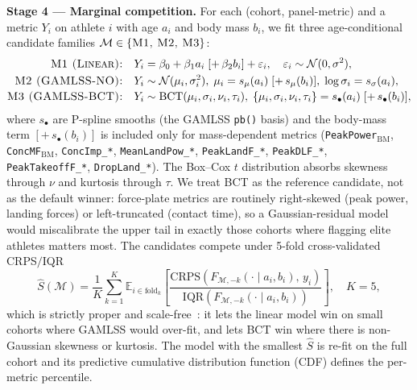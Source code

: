 \documentclass[10pt]{article}
\begin{document}
\textbf{Stage 4 --- Marginal competition.}
For each (cohort, panel-metric) and a metric $Y_i$ on athlete $i$ with
age $a_i$ and body mass $b_i$, we fit three age-conditional candidate
families $\mathcal{M} \in \{\textsc{M1, M2, M3}\}$:
\begin{align}
\textsc{M1 (Linear):}\quad &
Y_i = \beta_0 + \beta_1 a_i \;[+\, \beta_2 b_i] + \varepsilon_i,
\quad \varepsilon_i \sim \mathcal{N}(0, \sigma^2),
\label{eq:m1}\\[-1pt]
\textsc{M2 (GAMLSS-NO):}\quad &
Y_i \sim \mathcal{N}(\mu_i, \sigma_i^2),\;
\mu_i = s_\mu(a_i) \;[+\, s_\mu(b_i)],\;
\log \sigma_i = s_\sigma(a_i),
\label{eq:m2}\\[-1pt]
\textsc{M3 (GAMLSS-BCT):}\quad &
Y_i \sim \mathrm{BCT}(\mu_i, \sigma_i, \nu_i, \tau_i),\;
\{\mu_i, \sigma_i, \nu_i, \tau_i\} = s_\bullet(a_i) \;[+\, s_\bullet(b_i)],
\label{eq:m3}
\end{align}
where $s_\bullet$ are P-spline smooths (the GAMLSS \texttt{pb()} basis)
and the body-mass term $[+\, s_\bullet(b_i)]$ is included only for
mass-dependent metrics (\texttt{PeakPower$_{\text{BM}}$},
\texttt{ConcMF$_{\text{BM}}$}, \texttt{ConcImp\_*},
\texttt{MeanLandPow\_*}, \texttt{PeakLandF\_*}, \texttt{PeakDLF\_*},
\texttt{PeakTakeoffF\_*}, \texttt{DropLand\_*}). The Box--Cox $t$
distribution \cite{rigby2005gamlss, stasinopoulos2007gamlss} absorbs
skewness through $\nu$ and kurtosis through $\tau$. We treat BCT as
the reference candidate, not as the default winner: force-plate
metrics are routinely right-skewed (peak power, landing forces) or
left-truncated (contact time), so a Gaussian-residual model would
miscalibrate the upper tail in exactly those cohorts where flagging
elite athletes matters most. The candidates compete under 5-fold
cross-validated CRPS$/$IQR
\begin{equation}
\widehat{S}(\mathcal{M}) =
\frac{1}{K} \sum_{k=1}^{K}
\mathbb{E}_{i \in \text{fold}_k}\!\left[
\frac{\mathrm{CRPS}\!\left(F_{\mathcal{M},-k}(\cdot \mid a_i, b_i),\, y_i\right)}
     {\mathrm{IQR}\!\left(F_{\mathcal{M},-k}(\cdot \mid a_i, b_i)\right)}
\right],\quad K = 5,
\label{eq:crps}
\end{equation}
which is strictly proper and scale-free~\cite{gneiting2007proper}: it
lets the linear model win on small cohorts where GAMLSS would over-fit,
and lets BCT win where there is non-Gaussian skewness or kurtosis.
The model with the smallest $\widehat{S}$ is re-fit on the full
cohort and its predictive cumulative distribution function (CDF) defines
the per-metric percentile.
\end{document}

